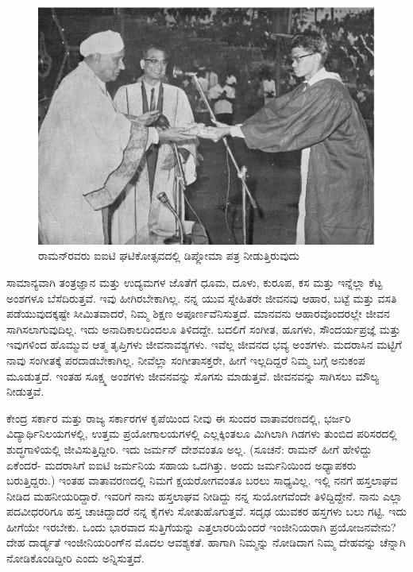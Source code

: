 \begin{figure}
\includegraphics{"images/15.jpg"}
\caption{ರಾಮನ್‍ರವರು ಐಐಟಿ ಘಟಿಕೋತ್ಸವದಲ್ಲಿ ಡಿಪ್ಲೋಮಾ ಪತ್ರ ನೀಡುತ್ತಿರುವುದು}
\end{figure}

ಸಾಮಾನ್ಯವಾಗಿ ತಂತ್ರಜ್ಞಾನ ಮತ್ತು ಉದ್ಯಮಗಳ ಜೊತೆಗೆ ಧೂಮ, ದೂಳು, ಕುರೂಪ, ಕಸ ಮತ್ತು ಇನ್ನೆಲ್ಲಾ ಕೆಟ್ಟ ಅಂಶಗಳೂ ಬೆಸೆದಿರುತ್ತವೆ. ಇವು ಹೀಗಿರಬೇಕಾಗಿಲ್ಲ. ನನ್ನ ಯುವ ಸ್ನೇಹಿತರೇ ಜೀವನವು ಆಹಾರ, ಬಟ್ಟೆ ಮತ್ತು ವಸತಿ ಪಡೆಯುವುದಕ್ಕಷ್ಟೇ ಸೀಮಿತವಾದರೆ, ನಿಮ್ಮ ಶಿಕ್ಷಣ ಅಪೂರ್ಣವೆನಿಸುತ್ತದೆ. ಮಾನವನು ಆಹಾರವೊಂದರಲ್ಲೇ ಜೀವನ ಸಾಗಿಸಲಾಗುವುದಿಲ್ಲ. ಇದು ಅನಾದಿಕಾಲದಿಂದಲೂ ತಿಳಿದದ್ದೇ. ಬದಲಿಗೆ ಸಂಗೀತ, ಹೂಗಳು, ಸೌಂದರ್ಯಪ್ರಜ್ಞೆ ಮತ್ತು ಇವುಗಳಿಂದ ಹೊಮ್ಮುವ ಆತ್ಮ ತೃಪ್ತಿಗಳು ಜೀವನಾವಶ್ಯಗಳು. ಇವೆಲ್ಲ ಜೀವನದ ಭವ್ಯ ಅಂಶಗಳು. ಮದರಾಸಿನ ಮಟ್ಟಿಗೆ ನಾವು ಸಂಗೀತಕ್ಕೆ ಪರದಾಡಬೇಕಾಗಿಲ್ಲ. ನೀವೆಲ್ಲಾ ಸಂಗೀತಾಸಕ್ತರೇ, ಹೀಗೆ ಇಲ್ಲದಿದ್ದರೆ ನಿಮ್ಮ ಬಗ್ಗೆ ಅನುಕಂಪ ಮೂಡುತ್ತದೆ. ಇಂತಹ ಸೂಕ್ಷ್ಮ ಅಂಶಗಳು ಜೀವನವನ್ನು ಸೊಗಸು ಮಾಡುತ್ತವೆ. ಜೀವನವನ್ನು ಸಾಗಿಸಲು ಮೌಲ್ಯ ನೀಡುತ್ತವೆ.

ಕೇಂದ್ರ ಸರ್ಕಾರ ಮತ್ತು ರಾಜ್ಯ ಸರ್ಕಾರಗಳ ಕೃಪೆಯಿಂದ ನೀವು ಈ ಸುಂದರ ವಾತಾವರಣದಲ್ಲಿ, ಭರ್ಜರಿ ವಿದ್ಯಾರ್ಥಿನಿಲಯಗಳಲ್ಲಿ, ಉತ್ತಮ ಪ್ರಯೋಗಾಲಯಗಳಲ್ಲಿ ಎಲ್ಲಕ್ಕಿಂತಲೂ ಮಿಗಿಲಾಗಿ ಗಿಡಗಳು ತುಂಬಿದ ಪರಿಸರದಲ್ಲಿ ಶುದ್ಧಗಾಳಿಯಲ್ಲಿ ಜೀವಿಸುತ್ತಿದ್ದೀರಿ. ಇದು ಜರ್ಮನ್ ದೇಶವಂತೂ ಅಲ್ಲ. (ಸೂಚನೆ: ರಾಮನ್ ಹೀಗೆ ಹೇಳಿದ್ದು ಏಕೆಂದರೆ- ಮದರಾಸಿಗೆ ಐಐಟಿ ಜರ್ಮನಿಯ ಸಹಾಯ ಒದಗಿತ್ತು. ಅಂದು ಜರ್ಮನಿಯಿಂದ ಅಧ್ಯಾಪಕರು ಬರುತ್ತಿದ್ದರು.) ಇಂತಹ ವಾತಾವರಣದಲ್ಲಿ ನಿಮಗೆ ಕ್ಷಯರೋಗವಂತೂ ಬರಲು ಸಾಧ್ಯವಿಲ್ಲ. ಇಲ್ಲಿ ನನಗೆ ಹಸ್ತಲಾಘವ ನೀಡಿದ ಮಹನೀಯರಿದ್ದಾರೆ. ಇವರಿಗೆ ನಾನು ಹಸ್ತಲಾಘವ ನೀಡಿದ್ದು ನನ್ನ ಸುಯೋಗವೆಂದೇ ತಿಳಿದ್ದಿದ್ದೇನೆ. ನಾನು ಎಲ್ಲಾ ಪದವೀಧರರಿಗೂ ಹಸ್ತ ಚಾಚಿದ್ದಾದರೆ ನನ್ನ ಕೈಗಳು ಸೋತುಹೊಗುತ್ತವೆ. ಸದೃಢ ಯುವಕರ ಹಸ್ತಗಳು ಬಲು ಗಟ್ಟಿ. ಇದು ಹೀಗೆಯೇ ಇರಬೇಕು. ಒಂದು ಭಾರವಾದ ಸುತ್ತಿಗೆಯನ್ನು ಎತ್ತಲಾರರಿಯೆಂದರೆ ಇಂಜೀನಿಯರಾಗಿ ಪ್ರಯೋಜನವೇನು? ದೇಹ ದಾರ್ಡ್ಯತೆ ಇಂಜೀನಿಯರಿಂಗ್‍ನ ಮೊದಲ ಆವಶ್ಯಕತೆ. ಹಾಗಾಗಿ ನಿಮ್ಮನ್ನು ನೋಡಿದಾಗ ನಿಮ್ಮ ದೇಹವನ್ನು ಚೆನ್ನಾಗಿ ನೋಡಿಕೊಂಡಿದ್ದೀರಿ ಎಂದು ಅನ್ನಿಸುತ್ತದೆ.



